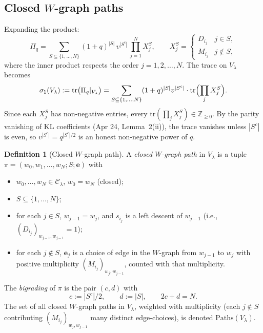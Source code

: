 \documentclass[11pt]{article}
\theoremstyle{definition}
\newtheorem{definition}[theorem]{Definition}
\begin{document}
\subsection*{Closed $W$-graph paths}

Expanding the product:
\begin{equation}\label{eq:Pi-expand}
\Pi_q = \sum_{S \subseteq \{1,\ldots,N\}} (1+q)^{|S|}\, v^{|S^c|}\, \prod_{j=1}^N X_j^S, \qquad X_j^S = \begin{cases} D_{i_j} & j \in S, \\ M_{i_j} & j \notin S, \end{cases}
\end{equation}
where the inner product respects the order $j = 1, 2, \ldots, N$. The trace on $V_\lambda$ becomes
\[
\sigma_1(V_\lambda) := \mathrm{tr}\bigl(\Pi_q|_{V_\lambda}\bigr) = \sum_{S \subseteq \{1,\ldots,N\}} (1+q)^{|S|} v^{|S^c|} \cdot \mathrm{tr}\Bigl(\prod_j X_j^S \Bigr).
\]
Since each $X_j^S$ has non-negative entries, every $\mathrm{tr}(\prod_j X_j^S) \in \mathbb{Z}_{\geq 0}$. By the parity vanishing of KL coefficients (Apr 24, Lemma~2(ii)), the trace vanishes unless $|S^c|$ is even, so $v^{|S^c|} = q^{|S^c|/2}$ is an honest non-negative power of $q$.

\begin{definition}[Closed $W$-graph path]\label{def:path}
A \emph{closed $W$-graph path} in $V_\lambda$ is a tuple $\pi = (w_0, w_1, \ldots, w_N; S; \mathbf{e})$ with
\begin{itemize}[leftmargin=2em,topsep=0.2em,itemsep=0.1em]
\item $w_0, \ldots, w_N \in \mathcal{C}_\lambda$, $w_0 = w_N$ (closed);
\item $S \subseteq \{1, \ldots, N\}$;
\item for each $j \in S$, $w_{j-1} = w_j$, and $s_{i_j}$ is a left descent of $w_{j-1}$ (i.e., $(D_{i_j})_{w_{j-1},w_{j-1}} = 1$);
\item for each $j \notin S$, $\mathbf{e}_j$ is a choice of edge in the $W$-graph from $w_{j-1}$ to $w_j$ with positive multiplicity $(M_{i_j})_{w_j, w_{j-1}}$, counted with that multiplicity.
\end{itemize}
The \emph{bigrading} of $\pi$ is the pair $(c, d)$ with
\[
c := |S^c|/2, \qquad d := |S|, \qquad 2c + d = N.
\]
The set of all closed $W$-graph paths in $V_\lambda$, weighted with multiplicity (each $j \notin S$ contributing $(M_{i_j})_{w_j, w_{j-1}}$ many distinct edge-choices), is denoted $\mathrm{Paths}(V_\lambda)$.
\end{definition}
\end{document}
